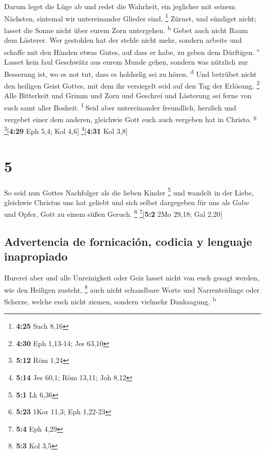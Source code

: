  Darum leget die Lüge ab und redet die Wahrheit, ein
jeglicher mit seinem Nächsten, sintemal wir untereinander Glieder sind.
\footnote{\textbf{4:25} Sach 8,16}  Zürnet, und sündiget
nicht; lasset die Sonne nicht über eurem Zorn untergehen.
\textsuperscript{b}  Gebet auch nicht Raum dem Lästerer.
 Wer gestohlen hat der stehle nicht mehr, sondern arbeite
und schaffe mit den Händen etwas Gutes, auf dass er habe, zu geben dem
Dürftigen. \textsuperscript{c}  Lasset kein faul
Geschwätz aus eurem Munde gehen, sondern was nützlich zur Besserung ist,
wo es not tut, dass es holdselig sei zu hören. \textsuperscript{d}
 Und betrübet nicht den heiligen Geist Gottes, mit dem
ihr versiegelt seid auf den Tag der Erlösung. \footnote{\textbf{4:30}
  Eph 1,13-14; Jes 63,10}  Alle Bitterkeit und Grimm und
Zorn und Geschrei und Lästerung sei ferne von euch samt aller Bosheit.
\textsuperscript{f}  Seid aber untereinander freundlich,
herzlich und vergebet einer dem anderen, gleichwie Gott euch auch
vergeben hat in Christo. \textsuperscript{g} \footnote{\textbf{5:12} Röm
  1,24}{[}\textbf{4:29} Eph 5,4; Kol 4,6{]} \footnote{\textbf{5:14} Jes
  60,1; Röm 13,11; Joh 8,12}{[}\textbf{4:31} Kol 3,8{]}

\hypertarget{section-4}{%
\section{5}\label{section-4}}

 So seid nun Gottes Nachfolger als die lieben Kinder
\footnote{\textbf{5:1} Lk 6,36}  und wandelt in der Liebe,
gleichwie Christus uns hat geliebt und sich selbst dargegeben für uns
als Gabe und Opfer, Gott zu einem süßen Geruch. \footnote{\textbf{5:23}
  1Kor 11,3; Eph 1,22-23} \footnote{\textbf{5:4} Eph 4,29}{[}\textbf{5:2}
2Mo 29,18; Gal 2,20{]}

\hypertarget{advertencia-de-fornicaciuxf3n-codicia-y-lenguaje-inapropiado}{%
\subsection{Advertencia de fornicación, codicia y lenguaje
inapropiado}\label{advertencia-de-fornicaciuxf3n-codicia-y-lenguaje-inapropiado}}

 Hurerei aber und alle Unreinigkeit oder Geiz lasset nicht
von euch gesagt werden, wie den Heiligen zusteht, \footnote{\textbf{5:3}
  Kol 3,5}  auch nicht schandbare Worte und Narrenteidinge
oder Scherze, welche euch nicht ziemen, sondern vielmehr Danksagung.
\textsuperscript{b}


